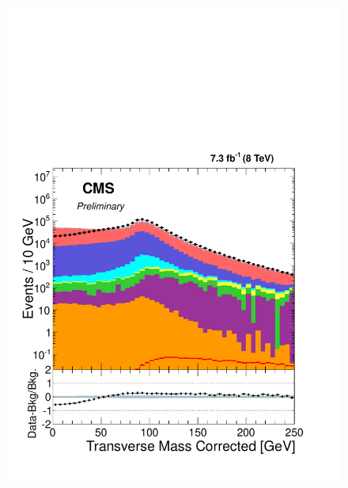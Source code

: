 \begin{figure}[!hp]
\centering
{\label{fig:mt_b}\includegraphics[scale=0.4]{analysis_figs/mt_b.pdf}}

\end{figure}
